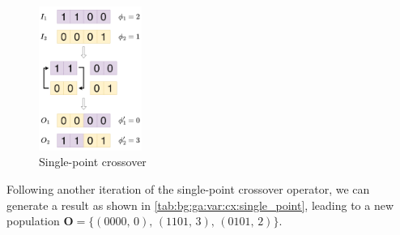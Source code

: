   \begin{figure}[ht!]
    \centering
    \includegraphics[width=0.3\textwidth]
      {img/theoretical_framework/Single-Point Crossover.png}
    \caption{Single-point crossover}
    \label{fig:bg:ga:var:cx:single_point}
  \end{figure}

  Following another iteration of the single-point crossover operator, we can 
  generate a result as shown in 
  \vref{tab:bg:ga:var:cx:single_point}, leading to a 
  new population \(\textbf{O} = \{(0000,\, 0),\, (1101,\, 3),\, (0101,\, 2)\}\).

